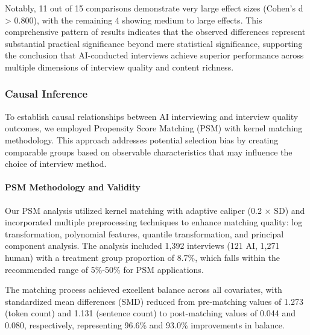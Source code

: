 \documentclass[sigchi,nonacm,manuscript]{acmart}
\begin{document}
Notably, 11 out of 15 comparisons demonstrate very large effect sizes (Cohen's d > 0.800), with the remaining 4 showing medium to large effects. This comprehensive pattern of results indicates that the observed differences represent substantial practical significance beyond mere statistical significance, supporting the conclusion that AI-conducted interviews achieve superior performance across multiple dimensions of interview quality and content richness.

\subsubsection{Causal Inference}

To establish causal relationships between AI interviewing and interview quality outcomes, we employed Propensity Score Matching (PSM) with kernel matching methodology. This approach addresses potential selection bias by creating comparable groups based on observable characteristics that may influence the choice of interview method.

\paragraph{PSM Methodology and Validity}

Our PSM analysis utilized kernel matching with adaptive caliper (0.2 × SD) and incorporated multiple preprocessing techniques to enhance matching quality: log transformation, polynomial features, quantile transformation, and principal component analysis. The analysis included 1,392 interviews (121 AI, 1,271 human) with a treatment group proportion of 8.7\%, which falls within the recommended range of 5\%-50\% for PSM applications.

The matching process achieved excellent balance across all covariates, with standardized mean differences (SMD) reduced from pre-matching values of 1.273 (token count) and 1.131 (sentence count) to post-matching values of 0.044 and 0.080, respectively, representing 96.6\% and 93.0\% improvements in balance.

\end{document}
